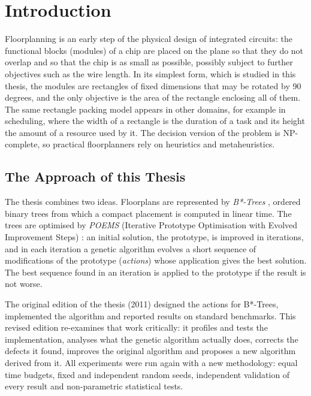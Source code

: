 \chapter{Introduction}
\label{sec:introduction}

Floorplanning is an early step of the physical design of integrated circuits: the functional blocks (modules) of a chip are placed on the plane so that they do not overlap and so that the chip is as small as possible, possibly subject to further objectives such as the wire length. In its simplest form, which is studied in this thesis, the modules are rectangles of fixed dimensions that may be rotated by 90 degrees, and the only objective is the area of the rectangle enclosing all of them. The same rectangle packing model appears in other domains, for example in scheduling, where the width of a rectangle is the duration of a task and its height the amount of a resource used by it. The decision version of the problem is NP-complete, so practical floorplanners rely on heuristics and metaheuristics.

\section{The Approach of this Thesis}

The thesis combines two ideas. Floorplans are represented by {\em B*-Trees} \cite{btree}, ordered binary trees from which a compact placement is computed in linear time. The trees are optimised by {\em POEMS} (Iterative Prototype Optimisation with Evolved Improvement Steps) \cite{poems}: an initial solution, the prototype, is improved in iterations, and in each iteration a genetic algorithm evolves a short sequence of modifications of the prototype ({\em actions}) whose application gives the best solution. The best sequence found in an iteration is applied to the prototype if the result is not worse.

The original edition of the thesis (2011) designed the actions for B*-Trees, implemented the algorithm and reported results on standard benchmarks. This revised edition re-examines that work critically: it profiles and tests the implementation, analyses what the genetic algorithm actually does, corrects the defects it found, improves the original algorithm and proposes a new algorithm derived from it. All experiments were run again with a new methodology: equal time budgets, fixed and independent random seeds, independent validation of every result and non-parametric statistical tests.


